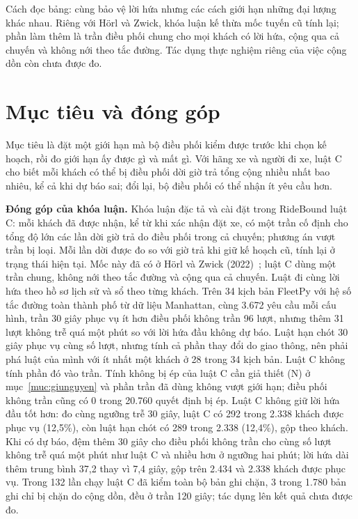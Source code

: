 Cách đọc bảng: cùng bảo vệ lời hứa nhưng các cách giới hạn những đại lượng khác nhau. Riêng với Hörl và Zwick,
khóa luận kế thừa mốc tuyến cũ tính lại; phần làm thêm là trần điều phối chung cho mọi khách có lời hứa, cộng
qua cả chuyến và không nới theo tắc đường. Tác dụng thực nghiệm riêng của việc cộng dồn còn chưa được đo.

\section{Mục tiêu và đóng góp}
\label{muc:c1-donggop}

Mục tiêu là đặt một giới hạn mà bộ điều phối kiểm được trước khi chọn kế hoạch, rồi đo giới hạn ấy được gì
và mất gì. Với hãng xe và người đi xe, luật C cho biết mỗi khách có thể bị điều phối dời giờ trả tổng cộng
nhiều nhất bao nhiêu, kể cả khi dự báo sai; đổi lại, bộ điều phối có thể nhận ít yêu cầu hơn.

\noindent\textbf{Đóng góp của khóa luận.}
Khóa luận đặc tả và cài đặt trong RideBound luật C: mỗi khách đã được nhận, kể từ khi xác nhận đặt xe,
có một trần cố định cho tổng độ lớn các lần dời giờ trả do điều phối trong cả chuyến; phương án vượt trần bị
loại. Mỗi lần dời được đo so với giờ trả khi giữ kế hoạch cũ, tính lại ở trạng thái hiện tại. Mốc này đã có
ở Hörl và Zwick (2022)~\cite{horl2022}; luật C dùng một trần chung, không nới theo tắc đường và cộng qua cả chuyến.
Luật đi cùng lời hứa theo hồ sơ lịch sử và sổ theo từng khách. Trên 34 kịch bản FleetPy với hệ số tắc đường
toàn thành phố từ dữ liệu Manhattan, cùng 3.672 yêu cầu mỗi cấu hình, trần 30 giây phục vụ ít hơn điều phối
không trần 96 lượt, nhưng thêm 31 lượt không trễ quá một phút so với lời hứa đầu không dự báo.
Luật hạn chót 30 giây phục vụ cùng số lượt, nhưng tính cả phần thay đổi do giao thông, nên phải phá luật của
mình với ít nhất một khách ở 28 trong 34 kịch bản. Luật C không tính phần đó vào trần. Tính không bị ép của
luật C cần giả thiết (N) ở mục~\ref{muc:giunguyen} và phần trần đã dùng không vượt giới hạn; điều phối không
trần cũng có 0 trong 20.760 quyết định bị ép. Luật C không giữ lời hứa đầu tốt hơn: đo cùng ngưỡng trễ
30 giây, luật C có 292 trong 2.338 khách được phục vụ (12,5\%), còn luật hạn chót có 289 trong 2.338 (12,4\%),
gộp theo khách. Khi có dự báo, đệm thêm 30 giây cho điều phối không trần cho cùng số lượt không trễ quá
một phút như luật C và nhiều hơn ở ngưỡng hai phút; lời hứa dài thêm trung bình 37,2 thay vì 7,4 giây,
gộp trên 2.434 và 2.338 khách được phục vụ. Trong 132 lần chạy luật C đã kiểm toàn bộ bản ghi chặn,
3 trong 1.780 bản ghi chỉ bị chặn do cộng dồn, đều ở trần 120 giây; tác dụng lên kết quả chưa được đo.

